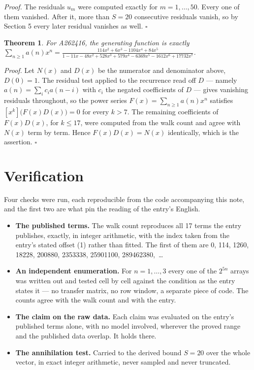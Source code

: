 \documentclass[11pt]{article}
\newtheorem{theorem}{Theorem}
\theoremstyle{definition}
\begin{document}
{\itshape Proof.} The residuals $u_m$ were computed exactly for $m = 1,\dots,50$. Every one of them vanished. After it, more than $S = 20$ consecutive residuals vanish, so by Section 5 every later residual vanishes as well. $\square$

\begin{theorem} For A262416, the generating function is exactly $\sum_{n\ge 1} a(n)x^n = \frac{114x^{2} + 6x^{3} - 1104x^{4} + 84x^{5}}{1 - 11x - 48x^{2} + 528x^{3} + 579x^{4} - 6369x^{5} - 1612x^{6} + 17732x^{7}}$.\end{theorem}

{\itshape Proof.} Let $N(x)$ and $D(x)$ be the numerator and denominator above, $D(0)=1$. The residual test applied to the recurrence read off $D$ --- namely $a(n) = \sum_i c_i a(n-i)$ with $c_i$ the negated coefficients of $D$ --- gives vanishing residuals throughout, so the power series $F(x)=\sum_{n\ge 1}a(n)x^n$ satisfies $[x^k]\bigl(F(x)D(x)\bigr) = 0$ for every $k > 7$. The remaining coefficients of $F(x)D(x)$, for $k \le 17$, were computed from the walk count and agree with $N(x)$ term by term. Hence $F(x)D(x) = N(x)$ identically, which is the assertion. $\square$

\section{Verification}

Four checks were run, each reproducible from the code accompanying this note, and the first two are what pin the reading of the entry's English.

\begin{itemize}

\item {\bfseries The published terms.} The walk count reproduces all 17 terms the entry publishes, exactly, in integer arithmetic, with the index taken from the entry's stated offset (1) rather than fitted. The first of them are 0, 114, 1260, 18228, 200880, 2353338, 25901100, 289462380,~\dots

\item {\bfseries An independent enumeration.} For $n = 1,\dots,3$ every one of the $2^{5n}$ arrays was written out and tested cell by cell against the condition as the entry states it --- no transfer matrix, no row window, a separate piece of code. The counts agree with the walk count and with the entry.

\item {\bfseries The claim on the raw data.} Each claim was evaluated on the entry's published terms alone, with no model involved, wherever the proved range and the published data overlap. It holds there.

\item {\bfseries The annihilation test.} Carried to the derived bound $S = 20$ over the whole vector, in exact integer arithmetic, never sampled and never truncated.

\end{itemize}
\end{document}
